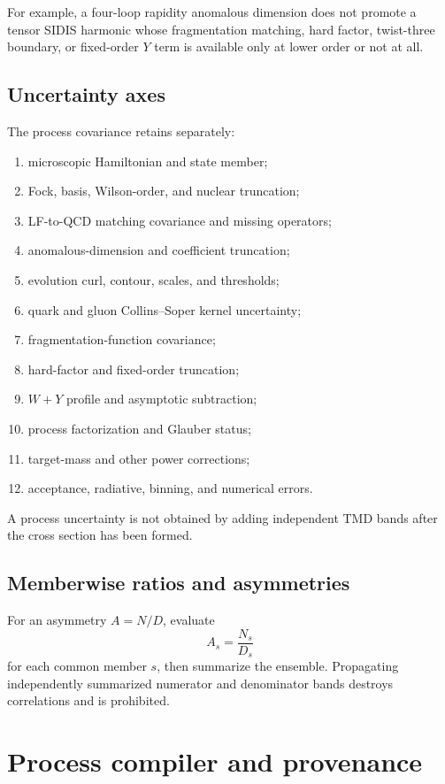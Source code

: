 \documentclass[11pt]{article}
\begin{document}
For example, a four-loop rapidity anomalous dimension does not promote a tensor SIDIS harmonic whose fragmentation matching, hard factor, twist-three boundary, or fixed-order \(Y\) term is available only at lower order or not at all.

\subsection{Uncertainty axes}

The process covariance retains separately:
\begin{enumerate}
\item microscopic Hamiltonian and state member;
\item Fock, basis, Wilson-order, and nuclear truncation;
\item LF-to-QCD matching covariance and missing operators;
\item anomalous-dimension and coefficient truncation;
\item evolution curl, contour, scales, and thresholds;
\item quark and gluon Collins--Soper kernel uncertainty;
\item fragmentation-function covariance;
\item hard-factor and fixed-order truncation;
\item \(W+Y\) profile and asymptotic subtraction;
\item process factorization and Glauber status;
\item target-mass and other power corrections;
\item acceptance, radiative, binning, and numerical errors.
\end{enumerate}
A process uncertainty is not obtained by adding independent TMD bands after the cross section has been formed.

\subsection{Memberwise ratios and asymmetries}

For an asymmetry \(A=N/D\), evaluate
\begin{equation}
 A_s=\frac{N_s}{D_s}
 \label{eq:memberwise-asymmetry}
\end{equation}
for each common member \(s\), then summarize the ensemble.  Propagating independently summarized numerator and denominator bands destroys correlations and is prohibited.

\section{Process compiler and provenance}
\label{sec:compiler}
\end{document}
